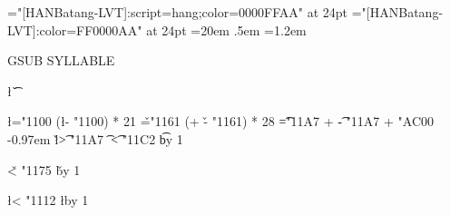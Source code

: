 \ifx\directlua\undefined\else \fi
\ifx\testfontname\undefined
    \def\testfontname{HANBatang-LVT}\fi
\font\hcrgsub="[\testfontname]:script=hang;color=0000FFAA" at 24pt
\font\hcrsyll="[\testfontname]:color=FF0000AA" at 24pt
\hcrsyll
\hsize=20em \parindent0pt \parskip.5em
\baselineskip=1.2em
\raggedbottom \raggedright \hfuzz\maxdimen
{}


\hcrgsub GSUB \hcrsyll SYLLABLE

\newcount\l
\newcount\v
\newcount\t
\newcount\cho
\newcount\chojung

\def\jongsong{%
    \begingroup
    \t="11A7 %
    \loop
	\hcrsyll \char\numexpr \chojung + \t - "11A7 + "AC00 \relax
	\kern-0.97em
	\hcrgsub \char\l \char\v \ifnum\t > "11A7 \char\t \fi
	\space
    \ifnum\t < "11C2 \advance\t by 1 \repeat
    \endgroup
}
\def\jungsong{%
    \begingroup
    \v="1161
    \loop
	\chojung\numexpr (\cho + \v - "1161) * 28 \relax
	\jongsong
    \ifnum\v < "1175 \advance\v by 1 \repeat
    \endgroup
}

\l="1100
\loop
    \cho\numexpr (\l - "1100) * 21 \relax
    \jungsong
    \endgraf
\ifnum\l < "1112 \advance\l by 1 \repeat

\bye
